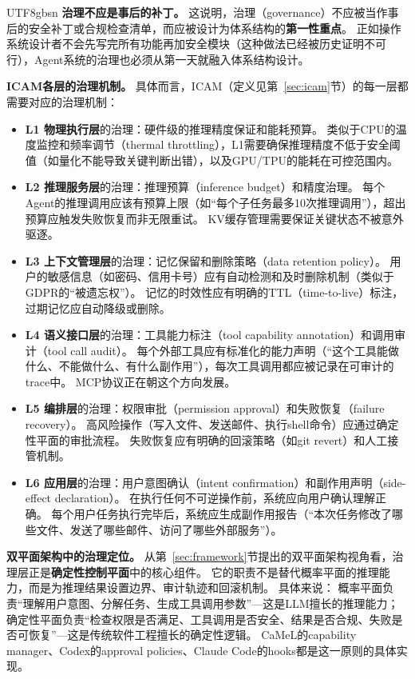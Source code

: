 \documentclass[11pt,a4paper]{article}
\begin{document}
\begin{CJK*}{UTF8}{gbsn}
\textbf{治理不应是事后的补丁。}
这说明，治理（governance）不应被当作事后的安全补丁或合规检查清单，而应被设计为体系结构的\textbf{第一性重点}。
正如操作系统设计者不会先写完所有功能再加安全模块（这种做法已经被历史证明不可行\cite{ostep_2023}），Agent系统的治理也必须从第一天就融入体系结构设计。

\textbf{ICAM各层的治理机制。}
具体而言，ICAM（定义见第~\ref{sec:icam}节）的每一层都需要对应的治理机制：

\begin{itemize}[nosep]
\item \textbf{L1 物理执行层}的治理：硬件级的推理精度保证和能耗预算。
类似于CPU的温度监控和频率调节（thermal throttling），L1需要确保推理精度不低于安全阈值（如量化不能导致关键判断出错），以及GPU/TPU的能耗在可控范围内。

\item \textbf{L2 推理服务层}的治理：推理预算（inference budget）和精度治理。
每个Agent的推理调用应该有预算上限（如``每个子任务最多10次推理调用''），超出预算应触发失败恢复而非无限重试。
KV缓存管理需要保证关键状态不被意外驱逐。

\item \textbf{L3 上下文管理层}的治理：记忆保留和删除策略（data retention policy）。
用户的敏感信息（如密码、信用卡号）应有自动检测和及时删除机制（类似于GDPR的``被遗忘权''）。
记忆的时效性应有明确的TTL（time-to-live）标注，过期记忆应自动降级或删除。

\item \textbf{L4 语义接口层}的治理：工具能力标注（tool capability annotation）和调用审计（tool call audit）。
每个外部工具应有标准化的能力声明（``这个工具能做什么、不能做什么、有什么副作用''），每次工具调用都应被记录在可审计的trace中。
MCP协议\cite{mcp_intro_2026}正在朝这个方向发展。

\item \textbf{L5 编排层}的治理：权限审批（permission approval）和失败恢复（failure recovery）。
高风险操作（写入文件、发送邮件、执行shell命令）应通过确定性平面的审批流程。
失败恢复应有明确的回滚策略（如git revert）和人工接管机制。

\item \textbf{L6 应用层}的治理：用户意图确认（intent confirmation）和副作用声明（side-effect declaration）。
在执行任何不可逆操作前，系统应向用户确认理解正确。
每个用户任务执行完毕后，系统应生成副作用报告（``本次任务修改了哪些文件、发送了哪些邮件、访问了哪些外部服务''）。
\end{itemize}

\textbf{双平面架构中的治理定位。}
从第~\ref{sec:framework}节提出的双平面架构视角看，治理层正是\textbf{确定性控制平面}中的核心组件。
它的职责不是替代概率平面的推理能力，而是为推理结果设置边界、审计轨迹和回滚机制。
具体来说：
概率平面负责``理解用户意图、分解任务、生成工具调用参数''---这是LLM擅长的推理能力；
确定性平面负责``检查权限是否满足、工具调用是否安全、结果是否合规、失败是否可恢复''---这是传统软件工程擅长的确定性逻辑。
CaMeL\cite{debenedetti2025camel}的capability manager、Codex\cite{openai_codex_approvals_2026}的approval policies、Claude Code\cite{anthropic_claudecode_security_2026}的hooks都是这一原则的具体实现。


\end{CJK*}
\end{document}
